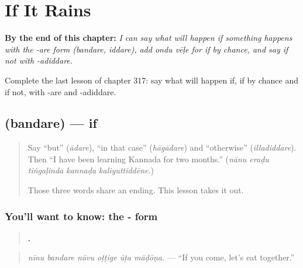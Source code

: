
\chapter{If It Rains}
\label{ch:ka-if-it-rains}

\begin{chapteropening}
\textbf{By the end of this chapter:} \emph{I can say what will happen if something happens with the -are form (bandare, iddare), add ondu vēḷe for if by chance, and say if not with -adiddare.}

Complete the last lesson of chapter 317: say what will happen if, if by chance and if not, with -are and -adiddare.
\end{chapteropening}

\section[\texorpdfstring{\kn{ಬಂದರೆ} (bandare)}{ಬಂದರೆ (bandare)}]{ (bandare) — if}

\label{lesson:KA-C317-bandare}



\begin{quote}
Say \textquotedblleft{}but\textquotedblright{} (\emph{ādare}), \textquotedblleft{}in that case\textquotedblright{} (\emph{hāgādare}) and \textquotedblleft{}otherwise\textquotedblright{} (\emph{illadiddare}). Then \textquotedblleft{}I have been learning Kannada for two months.\textquotedblright{} (\emph{nānu eraḍu tiṅgaḷinda kannaḍa kaliyuttiddēne}.)

Those three words share an ending. This lesson takes it out.
\end{quote}

\subsection*{You'll want to know: the - form}
\begin{quote}
\textbf{     .}
\end{quote}

\begin{quote}
\emph{nīnu bandare nāvu oṭṭige ūṭa māḍōṇa.} — \textquotedblleft{}If you come, let's eat together.\textquotedblright{}
\end{quote}

